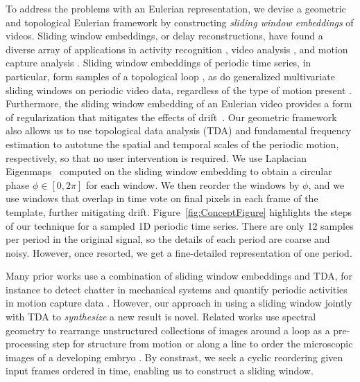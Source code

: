 \documentclass{article}
\begin{document}
To address the problems with an Eulerian representation, we devise a geometric and topological Eulerian framework by constructing {\em sliding window embeddings} of videos.  Sliding window embeddings, or delay reconstructions, have found a diverse array of applications in activity recognition \cite{frank2010activity,venkataraman2016shape}, video analysis \cite{tralie2017quasi}, and motion capture analysis \cite{venkataraman2016shape}.  Sliding window embeddings of periodic time series, in particular, form samples of a topological loop \cite{perea2015sliding}, as do generalized multivariate sliding windows on periodic video data, regardless of the type of motion present \cite{traliehigh, tralie2017quasi}.  Furthermore, the sliding window embedding of an Eulerian video provides a form of regularization that mitigates the effects of drift~\cite{tralie2017quasi}.  Our geometric framework also allows us to use topological data analysis (TDA) \cite{edelsbrunner2000topological,edelsbrunner2008persistent,edelsbrunner2010computational,carlsson2009topology,ghrist2014elementary} and fundamental frequency estimation \cite{Mcleod05asmarter} to autotune the spatial and temporal scales of the periodic motion, respectively, so that no user intervention is required.  We use Laplacian Eigenmaps~\cite{belkin2003laplacian} computed on the sliding window embedding to obtain a circular phase $\phi \in [0, 2\pi]$ for each window.  We then reorder the windows by $\phi$, and we use windows that overlap in time vote on final pixels in each frame of the template, further mitigating drift.  Figure~\ref{fig:ConceptFigure} highlights the steps of our technique for a sampled 1D periodic time series.  There are only 12 samples per period in the original signal, so the details of each period are coarse and noisy.  However, once resorted, we get a fine-detailed representation of one period.


Many prior works use a combination of sliding window embeddings and TDA, for instance to detect chatter in mechanical systems \cite{khasawneh2016chatter} and quantify periodic activities in motion capture data \cite{vejdemo2015cohomological, venkataraman2016persistent}. However, our approach in using a sliding window jointly with TDA to {\em synthesize} a new result is novel. Related works use spectral geometry to rearrange unstructured collections of images around a loop as a pre-processing step for structure from motion \cite{averbuch2015ringit} or along a line to order the microscopic images of a developing embryo \cite{dsilva2015diffusionvecordering}. By constrast, we seek a cyclic reordering given input frames ordered in time, enabling us to construct a sliding window.
\end{document}
